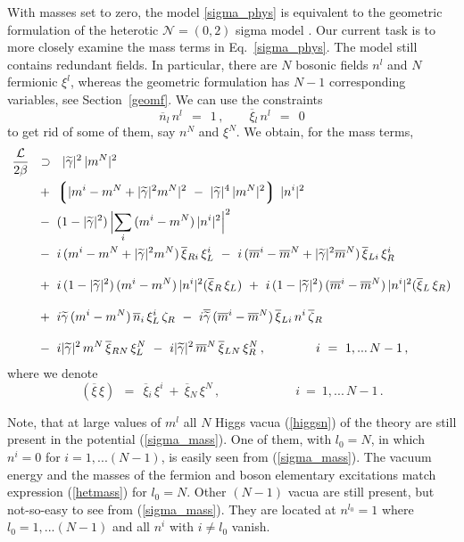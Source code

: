 \documentclass[12pt]{article}
\newcommand{\ntwoo}{${\mathcal N}= \left(0,2\right) $ }
\newcommand{\wt}{\widetilde}
\newcommand{\ov}{\overline}
\newcommand{\mc}[1]{\mathcal{#1}}
\newcommand{\lgr}{\left\lgroup}
\newcommand{\rgr}{\right\rgroup}
\newcommand{\bxir}{\ov{\xi}{}_R}
\newcommand{\bxil}{\ov{\xi}{}_L}
\newcommand{\xir}{\xi_R}
\newcommand{\xil}{\xi_L}
\newcommand{\bzr}{\ov{\zeta}{}_R}
\newcommand{\zr}{\zeta_R}
\newcommand{\tgamma}{\wt{\gamma}}
\begin{document}
	With masses set to zero, the model \eqref{sigma_phys} is equivalent to the 
	geometric formulation of the heterotic \ntwoo sigma model \cite{SYhet,BSYhet}.
Our current task is to more closely examine  the mass terms in Eq.~\eqref{sigma_phys}.
	The model still contains redundant fields.
	In particular, there are $N$ bosonic fields $n^l$ and $N$ fermionic $\xi^l$,
	whereas the geometric formulation has $N-1$ corresponding variables, see
	Section~\ref{geomf}.
	We can use the constraints
\[
	\ov{n}{}_l\, n^l ~~=~~ 1\,, \qquad \ov{\xi}{}_l\, n^l ~~=~~ 0
\]
	to get rid of some of them, say $ n^N $ and $ \xi^N $.
	We obtain, for the mass terms,
\begin{align}
%
\notag
	\frac{\mc{L}}{2\beta} & ~~\supset~~ 
	|\tgamma|^2\, |m^N|^2  
	\\
%
\notag
	&~
	~+~
	\lgr | m^i - m^N + |\tgamma|^2 m^N |^2 ~-~ |\tgamma|^4\, |m^N|^2 \rgr\, |n^i|^2 
	\\
%
\notag
	&~
	~-~ (1 - |\tgamma|^2)\, \Bigl|\sum_i\, (m^i - m^N)\,|n^i|^2 \Bigr|^2
	\\
%	
\label{sigma_mass}
	&~
	~-~ i\,(m^i - m^N + |\tgamma|^2 m^N )\,\ov{\xi}{}_{Ri}\,\xi_L^i
	~-~ i\,(\ov{m}{}^i - \ov{m}{}^N + |\tgamma|^2\ov{m}{}^N)\, \ov{\xi}{}_{Li}\, \xi_R^i 
	\\[3mm]
%
\notag
	&~
	~+~ i\,(1-|\tgamma|^2)\,(m^i - m^N)\,|n^i|^2(\bxir\,\xil) 
	~+~ i\,(1-|\tgamma|^2)\,(\ov{m}{}^i - \ov{m}{}^N)\,|n^i|^2(\bxil\,\xir)
	\\[3mm]
%
\notag
	&~
	~+~ i \tgamma\, (m^i - m^N)\, \ov{n}{}_i\, \xi_L^i\, \zr
	~-~ i \ov{\tgamma}\, (\ov{m}{}^i - \ov{m}{}^N)\, \ov{\xi}{}_{Li}\, n^i\, \bzr
	\\[3mm]
%
\notag
	&~
	~-~ i |\tgamma|^2\, m^N\, \ov{\xi}{}_{RN}\, \xi_L^N
	~-~ i |\tgamma|^2\, \ov{m}^N\, \ov{\xi}{}_{LN}\, \xi_R^N\,,
	\qquad\qquad
	i ~=~ 1,...\,N-1\,,
\end{align}
	where we denote
\[
	(\ov{\xi}\, \xi) ~~=~~ \ov{\xi}{}_i\, \xi^i  ~+~  \ov{\xi}{}_N\, \xi^N\,,
	\qquad\qquad\qquad
	i ~=~ 1,...\,N-1\,.
\]

\vspace{2mm}

Note, that at large values of $m^l$ all $N$ Higgs vacua (\ref{higgsn}) of the theory  are
still present in the potential (\ref{sigma_mass}).
One of them, with $l_0=N$, in which  $n^i=0$ for {$i=1,...(N-1)$},
is easily seen from (\ref{sigma_mass}). The vacuum energy and the
masses of the fermion and boson elementary excitations match
expression (\ref{hetmass}) for $l_0=N$. Other $(N-1)$
vacua are still present, but not-so-easy to see from (\ref{sigma_mass}).
They are located at $n^{l_0}=1$ where $l_0=1,...(N-1)$ and  all $  n^i$ with $i\neq l_0$
vanish.
\end{document}
